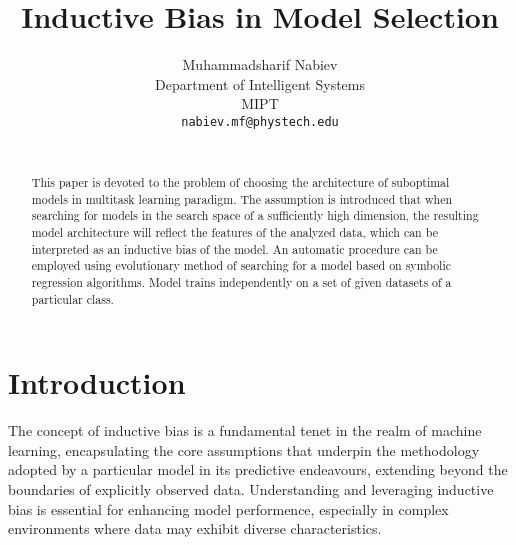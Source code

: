 \documentclass{article}
\title{Inductive Bias in Model Selection}
\author{
    Muhammadsharif Nabiev \\
    Department of Intelligent Systems\\
    MIPT\\
    \texttt{nabiev.mf@phystech.edu} \\
    \texttt{} \\
}
\date{}
\begin{document}
\maketitle

\begin{abstract}

This paper is devoted to the problem of choosing the architecture of suboptimal models in multitask learning paradigm. The assumption is introduced that when searching for models in the search space of a sufficiently high dimension, the resulting model architecture will reflect the features of the analyzed data, which can be interpreted as an inductive bias of the model. An automatic procedure can be employed using evolutionary method of searching for a model based on symbolic regression algorithms. Model trains independently on a set of given datasets of a particular class. 



\end{abstract}


\section{Introduction} 
The concept of inductive bias is a fundamental tenet in the realm of machine learning, encapsulating the core assumptions that underpin the methodology adopted by a particular model in its predictive endeavours, extending beyond the boundaries of explicitly observed data. Understanding and leveraging inductive bias is essential for enhancing model performence, especially in complex environments where data may exhibit diverse characteristics. 
\end{document}
